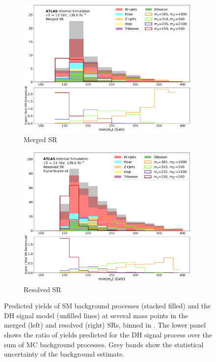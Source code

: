 \begin{figure}[htbp]
  \centering
    \begin{subfigure}[t]{0.48\textwidth}
    \centering
     \includegraphics[width = 0.99\textwidth]{Figures/7/SR1L_Merged/TARJets10_minmS_mgd.pdf}
    \caption{Merged SR}
    \end{subfigure}
    \begin{subfigure}[t]{0.48\textwidth}
    \centering
     \includegraphics[width = 0.99\textwidth]{Figures/7/SR1L_Resolved/TARJets10_minmS_res.pdf}
     \caption{Resolved SR}
    \end{subfigure}
    \caption{Predicted yields of SM background processes (stacked filled) and the DH signal model (unfilled lines) at several mass points in the merged (left) and resolved (right) SRs, binned in \minms. The lower panel shows the ratio of yields predicted for the DH signal process over the sum of MC background processes. Grey bands show the statistical uncertainty of the background estimate.}
   \label{fig:minms_shape_discrimination}
\end{figure}



